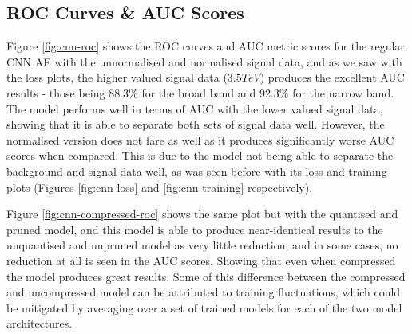 \documentclass[a4paper]{article}
\theoremstyle{plain}
\theoremstyle{definition}
\begin{document}
		\subsection{ROC Curves \& AUC Scores}

			Figure \ref{fig:cnn-roc} shows the ROC curves and AUC metric scores for the regular CNN AE with the unnormalised and normalised signal data, and as we saw with the loss plots, the higher valued signal data ($3.5  TeV$) produces the excellent AUC results - those being 88.3\% for the broad band and 92.3\% for the narrow band. The model performs well in terms of AUC with the lower valued signal data, showing that it is able to separate both sets of signal data well. However, the normalised version does not fare as well as it produces significantly worse AUC scores when compared. This is due to the model not being able to separate the background and signal data well, as was seen before with its loss and training plots (Figures \ref{fig:cnn-loss} and \ref{fig:cnn-training} respectively).

			Figure \ref{fig:cnn-compressed-roc} shows the same plot but with the quantised and pruned model, and this model is able to produce near-identical results to the unquantised and unpruned model as very little reduction, and in some cases, no reduction at all is seen in the AUC scores. Showing that even when compressed the model produces great results. Some of this difference between the compressed and uncompressed model can be attributed to training fluctuations, which could be mitigated by averaging over a set of trained models for each of the two model architectures. 
\end{document}
